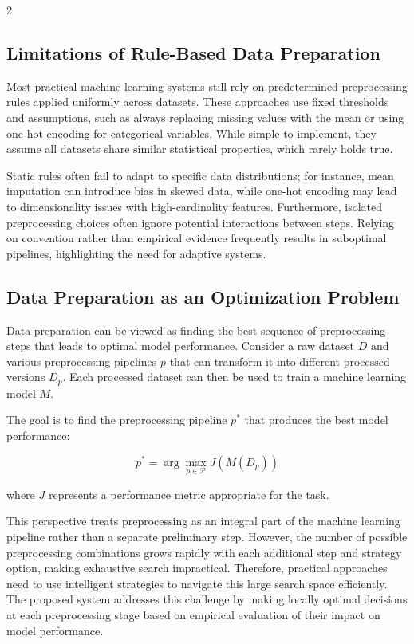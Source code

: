 \documentclass[11pt,a4paper]{article}
\begin{document}
\begin{multicols}{2}
\subsection{Limitations of Rule-Based Data Preparation}

Most practical machine learning systems still rely on predetermined preprocessing rules applied uniformly across datasets. These approaches use fixed thresholds and assumptions, such as always replacing missing values with the mean or using one-hot encoding for categorical variables. While simple to implement, they assume all datasets share similar statistical properties, which rarely holds true.

Static rules often fail to adapt to specific data distributions; for instance, mean imputation can introduce bias in skewed data, while one-hot encoding may lead to dimensionality issues with high-cardinality features. Furthermore, isolated preprocessing choices often ignore potential interactions between steps. Relying on convention rather than empirical evidence frequently results in suboptimal pipelines, highlighting the need for adaptive systems.

\subsection{Data Preparation as an Optimization Problem}

Data preparation can be viewed as finding the best sequence of preprocessing steps that leads to optimal model performance. Consider a raw dataset $D$ and various preprocessing pipelines $p$ that can transform it into different processed versions $D_p$. Each processed dataset can then be used to train a machine learning model $M$.

The goal is to find the preprocessing pipeline $p^*$ that produces the best model performance:

\[
p^* = \arg\max_{p \in \mathcal{P}} J(M(D_p))
\]

where $J$ represents a performance metric appropriate for the task.

This perspective treats preprocessing as an integral part of the machine learning pipeline rather than a separate preliminary step. However, the number of possible preprocessing combinations grows rapidly with each additional step and strategy option, making exhaustive search impractical. Therefore, practical approaches need to use intelligent strategies to navigate this large search space efficiently. The proposed system addresses this challenge by making locally optimal decisions at each preprocessing stage based on empirical evaluation of their impact on model performance.



\end{multicols}
\end{document}
